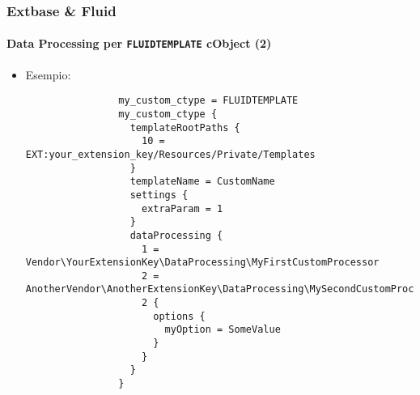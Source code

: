 \begin{frame}[fragile]
	\frametitle{Extbase \& Fluid}
	\framesubtitle{Data Processing per \texttt{FLUIDTEMPLATE} cObject (2)}

	\lstset{basicstyle=\tiny\ttfamily}

	\begin{itemize}

		\item Esempio: 

			\begin{lstlisting}
				my_custom_ctype = FLUIDTEMPLATE
				my_custom_ctype {
				  templateRootPaths {
				    10 = EXT:your_extension_key/Resources/Private/Templates
				  }
				  templateName = CustomName
				  settings {
				    extraParam = 1
				  }
				  dataProcessing {
				    1 = Vendor\YourExtensionKey\DataProcessing\MyFirstCustomProcessor
				    2 = AnotherVendor\AnotherExtensionKey\DataProcessing\MySecondCustomProcessor
				    2 {
				      options {
				        myOption = SomeValue
				      }
				    }
				  }
				}
			\end{lstlisting}

	\end{itemize}

\end{frame}

